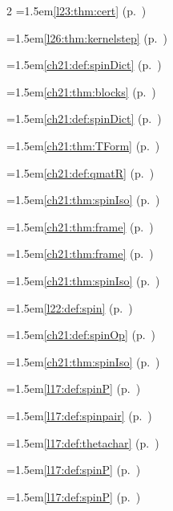 \begin{multicols}{2}
\hangindent=1.5em\quad \ref{l23:thm:cert} (p.~\pageref{l23:thm:cert})\par
\hangindent=1.5em\quad \ref{l26:thm:kernelstep} (p.~\pageref{l26:thm:kernelstep})\par
\hangindent=1.5em\quad \ref{ch21:def:spinDict} (p.~\pageref{ch21:def:spinDict})\par
\hangindent=1.5em\quad \ref{ch21:thm:blocks} (p.~\pageref{ch21:thm:blocks})\par
\hangindent=1.5em\quad \ref{ch21:def:spinDict} (p.~\pageref{ch21:def:spinDict})\par
\hangindent=1.5em\quad \ref{ch21:thm:TForm} (p.~\pageref{ch21:thm:TForm})\par
\hangindent=1.5em\quad \ref{ch21:def:qmatR} (p.~\pageref{ch21:def:qmatR})\par
\hangindent=1.5em\quad \ref{ch21:thm:spinIso} (p.~\pageref{ch21:thm:spinIso})\par
\hangindent=1.5em\quad \ref{ch21:thm:frame} (p.~\pageref{ch21:thm:frame})\par
\hangindent=1.5em\quad \ref{ch21:thm:frame} (p.~\pageref{ch21:thm:frame})\par
\hangindent=1.5em\quad \ref{ch21:thm:spinIso} (p.~\pageref{ch21:thm:spinIso})\par
\hangindent=1.5em\quad \ref{l22:def:spin} (p.~\pageref{l22:def:spin})\par
\hangindent=1.5em\quad \ref{ch21:def:spinOp} (p.~\pageref{ch21:def:spinOp})\par
\hangindent=1.5em\quad \ref{ch21:thm:spinIso} (p.~\pageref{ch21:thm:spinIso})\par
\hangindent=1.5em\quad \ref{l17:def:spinP} (p.~\pageref{l17:def:spinP})\par
\hangindent=1.5em\quad \ref{l17:def:spinpair} (p.~\pageref{l17:def:spinpair})\par
\hangindent=1.5em\quad \ref{l17:def:thetachar} (p.~\pageref{l17:def:thetachar})\par
\hangindent=1.5em\quad \ref{l17:def:spinP} (p.~\pageref{l17:def:spinP})\par
\hangindent=1.5em\quad \ref{l17:def:spinP} (p.~\pageref{l17:def:spinP})\par

\end{multicols}
